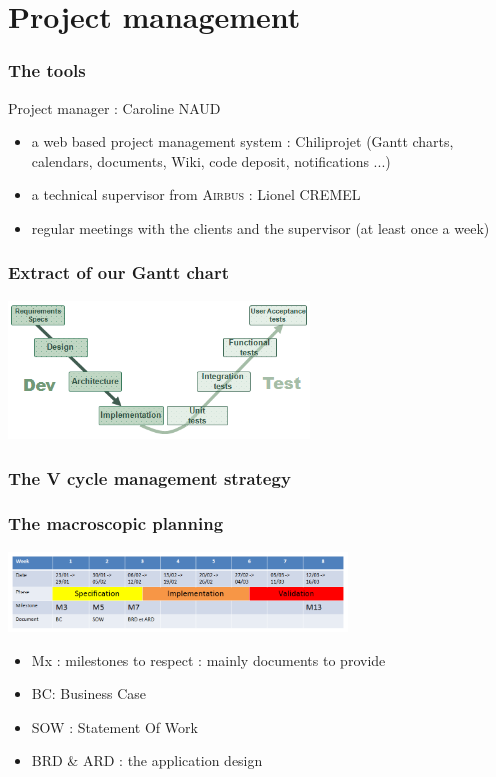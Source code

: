 \documentclass{beamer}
\begin{document}
\section{Project management}

\begin{frame}
	\frametitle{The tools}
Project manager : Caroline \textsc{NAUD}
	\begin{block}{}
    \begin{itemize}
		\item a web based project management system : Chiliprojet (Gantt charts, calendars, documents, Wiki, code deposit, notifications ...)
		\item a technical supervisor from \textsc{Airbus} : Lionel \textsc{CREMEL}
		\item regular meetings with the clients and the supervisor (at least once a week)
	\end{itemize}
	\end{block}
\end{frame}

\begin{frame}
	\frametitle{Extract of our Gantt chart}

    \begin{center}
		\includegraphics[width=8cm]{VCycle}	
	\end{center}
\end{frame}

\begin{frame}
	\frametitle{The V cycle management strategy}

    
\end{frame}

\begin{frame}
	\frametitle{The macroscopic planning}

    \begin{center}
		\includegraphics[width=9cm]{PlanningMacroscopique}	
	\end{center}
	
	\begin{block}{}
    \begin{itemize}
		\item Mx : milestones to respect : mainly documents to provide
		\item BC: Business Case
		\item SOW : Statement Of Work
		\item BRD \& ARD : the application design 
	\end{itemize}
	\end{block}
	
\end{frame}
\end{document}
